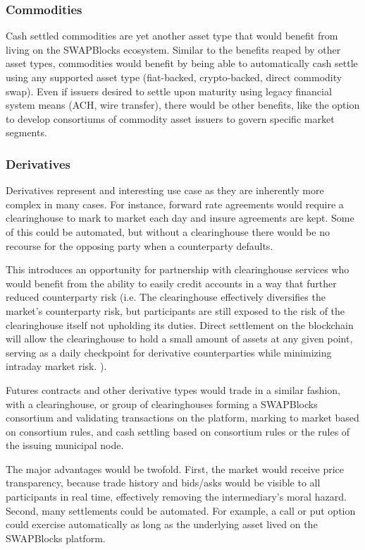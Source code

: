\documentclass[12pt]{article}
\begin{document}
\subsubsection{Commodities}
Cash settled commodities are yet another asset type that would benefit from living on the SWAPBlocks ecosystem. 
Similar to the benefits reaped by other asset types, commodities would benefit by being able to automatically cash 
settle using any supported asset type (fiat-backed, crypto-backed, direct commodity swap). Even if issuers desired 
to settle upon maturity using legacy financial system means (ACH, wire transfer), there would be other benefits, 
like the option to develop consortiums of commodity asset issuers to govern specific market segments.

\subsubsection{Derivatives}
Derivatives represent and interesting use case as they are inherently more complex in many cases. For instance, 
forward rate agreements would require a clearinghouse to mark to market each day and insure agreements are kept. Some 
of this could be automated, but without a clearinghouse there would be no recourse for the opposing party when a 
counterparty defaults.


This introduces an opportunity for partnership with clearinghouse services who would benefit from the ability to easily 
credit accounts in a way that further reduced counterparty risk (i.e. The clearinghouse effectively diversifies the 
market’s counterparty risk, but participants are still exposed to the risk of the clearinghouse itself not 
upholding its duties.  Direct settlement on the blockchain will allow the clearinghouse to hold a small amount of assets
at any given point, serving as a daily checkpoint for derivative counterparties while minimizing intraday market risk.
).

Futures contracts and other derivative types would trade in a similar fashion, with a clearinghouse, or group of 
clearinghouses forming a SWAPBlocks consortium and validating transactions on the platform, marking to market based 
on consortium rules, and cash settling based on consortium rules or the rules of the issuing municipal node.

The major advantages would be twofold. First, the market would receive price transparency, because trade history 
and bids/asks would be visible to all participants in real time, effectively removing the intermediary’s moral 
hazard. Second, many settlements could be automated. For example, a call or put option could exercise automatically 
as long as the underlying asset lived on the SWAPBlocks platform.
\end{document}
